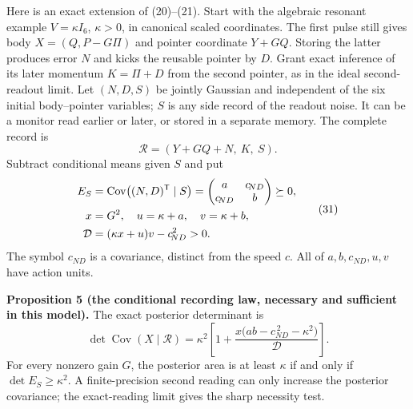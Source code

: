 \documentclass[11pt,a4paper]{article}
\begin{document}
Here is an exact extension of (20)--(21). Start with the algebraic
resonant example \(V=\kappa I_6\), \(\kappa>0\), in canonical scaled
coordinates. The first pulse still gives body \(X=(Q,P-G\Pi)\) and
pointer coordinate \(Y+GQ\). Storing the latter produces error \(N\) and
kicks the reusable pointer by \(D\). Grant exact inference of its later
momentum \(K=\Pi+D\) from the second pointer, as in the ideal
second-readout limit. Let \((N,D,S)\) be jointly Gaussian and
independent of the six initial body--pointer variables; \(S\) is any
side record of the readout noise. It can be a monitor read earlier or
later, or stored in a separate memory. The complete record is
\[\mathcal R=(Y+GQ+N,\ K,\ S).\] Subtract conditional means given \(S\)
and put \[\begin{aligned}
E_S&=\operatorname{Cov}\bigl((N,D)^{\sf T}\mid S\bigr)
=\begin{pmatrix}a&c\!_{ND}\\c\!_{ND}&b\end{pmatrix}\succeq0,\\
x&=G^2,\quad u=\kappa+a,\quad v=\kappa+b,\\
\mathcal D&=(\kappa x+u)v-c\!_{ND}^{\,2}>0.
\end{aligned}\tag{31}\] The symbol \(c\!_{ND}\) is a covariance,
distinct from the speed \(c\). All of \(a,b,c\!_{ND},u,v\) have action
units.

\textbf{Proposition 5 (the conditional recording law, necessary and
sufficient in this model).} The exact posterior determinant is
\[\boxed{\det\operatorname{Cov}(X\mid\mathcal R)
=\kappa^2\left[1+\frac{x\bigl(ab-c\!_{ND}^{\,2}-\kappa^2\bigr)}
                         {\mathcal D}\right].}\tag{32}\] For every
nonzero gain \(G\), the posterior area is at least \(\kappa\) if and
only if \(\det E_S\ge\kappa^2\). A finite-precision second reading can
only increase the posterior covariance; the exact-reading limit gives
the sharp necessity test.
\end{document}
